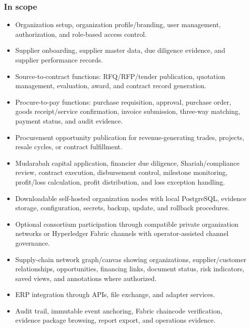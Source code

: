 \documentclass[11pt,a4paper]{article}
\begin{document}
\subsubsection{In scope}
\begin{itemize}
  \item Organization setup, organization profile/branding, user management, authorization, and role-based access control.
  \item Supplier onboarding, supplier master data, due diligence evidence, and supplier performance records.
  \item Source-to-contract functions: RFQ/RFP/tender publication, quotation management, evaluation, award, and contract record generation.
  \item Procure-to-pay functions: purchase requisition, approval, purchase order, goods receipt/service confirmation, invoice submission, three-way matching, payment status, and audit evidence.
  \item Procurement opportunity publication for revenue-generating trades, projects, resale cycles, or contract fulfillment.
  \item Mudarabah capital application, financier due diligence, Shariah/compliance review, contract execution, disbursement control, milestone monitoring, profit/loss calculation, profit distribution, and loss exception handling.
  \item Downloadable self-hosted organization nodes with local PostgreSQL, evidence storage, configuration, secrets, backup, update, and rollback procedures.
  \item Optional consortium participation through compatible private organization networks or Hyperledger Fabric channels with operator-assisted channel governance.
  \item Supply-chain network graph/canvas showing organizations, supplier/customer relationships, opportunities, financing links, document status, risk indicators, saved views, and annotations where authorized.
  \item ERP integration through APIs, file exchange, and adapter services.
  \item Audit trail, immutable event anchoring, Fabric chaincode verification, evidence package browsing, report export, and operations evidence.
\end{itemize}
\end{document}
